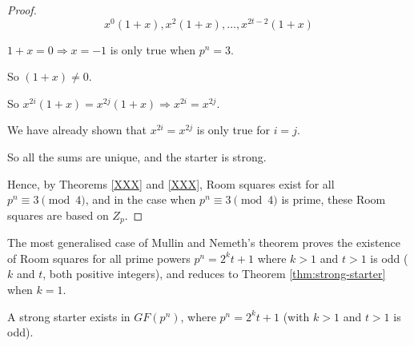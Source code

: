 \begin{proof}
\begin{equation*}
x^0(1 + x), x^2(1 + x), \ldots, x^{2t - 2}(1 + x)
\end{equation*}

$1 + x = 0 \Rightarrow x = -1$ is only true when $p^n = 3$.

So $(1 + x) \neq 0$.

So $x^{2i}(1 + x) = x^{2j}(1 + x) \Rightarrow x^{2i} = x^{2j}$.

We have already shown that $x^{2i} = x^{2j}$ is only true for $i = j$.

So all the sums are unique, and the starter is strong.

Hence, by Theorems
\ref{XXX}
and
\ref{XXX},
Room squares exist for all $p^n\equiv 3\pmod 4$, and in the case when $p^n\equiv 3\pmod 4$ is
prime, these Room squares are based on $Z_p$.
\end{proof}

The most generalised case of Mullin and Nemeth’s theorem proves the existence of Room squares for all prime powers $p^n = 2^kt + 1$ where $k > 1$ and $t > 1$ is odd ($k$ and $t$, both positive integers), and reduces to Theorem \ref{thm:strong-starter} when $k = 1$.

\begin{theorem}
\label{thm:strong-starter-3}
A strong starter exists in $GF(p^n)$, where $p^n = 2^kt + 1$
(with $k > 1$ and $t > 1$ is odd).
\end{theorem}

